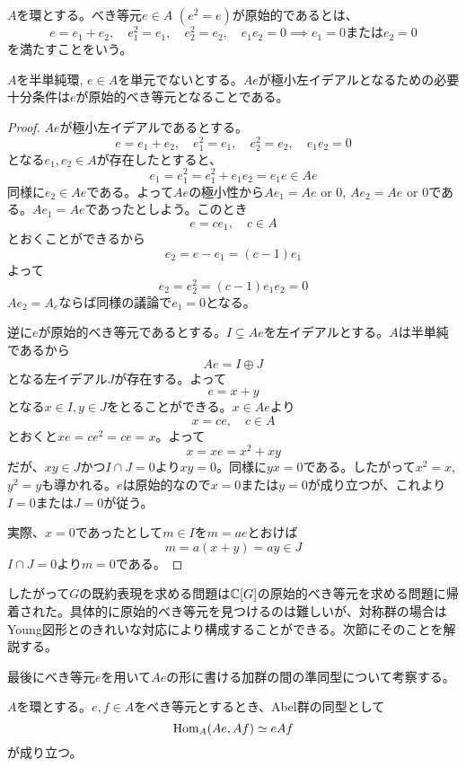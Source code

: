 \documentclass{ltjsreport}
\begin{document}
\begin{defin}
  $A$を環とする。べき等元$e\in A$ $(e^2=e)$が原始的であるとは、
  \[
  e=e_1+e_2,\quad e_1^2=e_1,\quad e_2^2=e_2,\quad e_1e_2=0\implies e_1=0\text{または}e_2=0 
  \]
  を満たすことをいう。
\end{defin}

\begin{prop}
  $A$を半単純環, $e\in A$を単元でないとする。$Ae$が極小左イデアルとなるための必要十分条件は$e$が原始的べき等元となることである。
\end{prop}

\begin{proof}
  $Ae$が極小左イデアルであるとする。
  \[
    e=e_1+e_2,\quad e_1^2=e_1,\quad e_2^2=e_2,\quad e_1e_2=0
  \]
  となる$e_1,e_2\in A$が存在したとすると、
  \[
  e_1=e_1^2=e_1^2+e_1e_2=e_1e\in Ae  
  \]
  同様に$e_2\in Ae$である。よって$Ae$の極小性から$Ae_1=Ae\text{ or }0$, $Ae_2=Ae\text{ or }0$である。$Ae_1=Ae$であったとしよう。このとき
  \[
  e=ce_1,\quad c\in A  
  \]
  とおくことができるから
  \[
  e_2=e-e_1=(c-1)e_1
  \]
  よって
  \[
  e_2=e_2^2=(c-1)e_1e_2=0
  \]
  $Ae_2=A_e$ならば同様の議論で$e_1=0$となる。
  
  逆に$e$が原始的べき等元であるとする。$I\subsetneq Ae$を左イデアルとする。$A$は半単純であるから
  \[
  Ae=I\oplus J  
  \]
  となる左イデアル$J$が存在する。よって
  \[
  e=x+y
  \]
  となる$x\in I, y\in J$をとることができる。$x\in Ae$より
  \[
  x=ce,\quad c\in A  
  \]
  とおくと$xe=ce^2=ce=x$。よって
  \[
  x=xe=x^2+xy  
  \]
  だが、$xy\in J$かつ$I\cap J=0$より$xy=0$。同様に$yx=0$である。したがって$x^2=x$, $y^2=y$も導かれる。$e$は原始的なので$x=0$または$y=0$が成り立つが、これより$I=0$または$J=0$が従う。

  実際、$x=0$であったとして$m\in I$を$m=ae$とおけば
  \[
  m=a(x+y)=ay\in J  
  \]
  $I\cap J=0$より$m=0$である。
\end{proof}

したがって$G$の既約表現を求める問題は$\mathbb{C}[G]$の原始的べき等元を求める問題に帰着された。具体的に原始的べき等元を見つけるのは難しいが、対称群の場合はYoung図形とのきれいな対応により構成することができる。次節にそのことを解説する。

最後にべき等元$e$を用いて$Ae$の形に書ける加群の間の準同型について考察する。

\begin{prop}\label{hom_of_cyclic_module}
  $A$を環とする。$e,f\in A$をべき等元とするとき、Abel群の同型として
  \[
  \text{Hom}_A(Ae,Af)\simeq eAf
  \]
  が成り立つ。
\end{prop}
\end{document}

